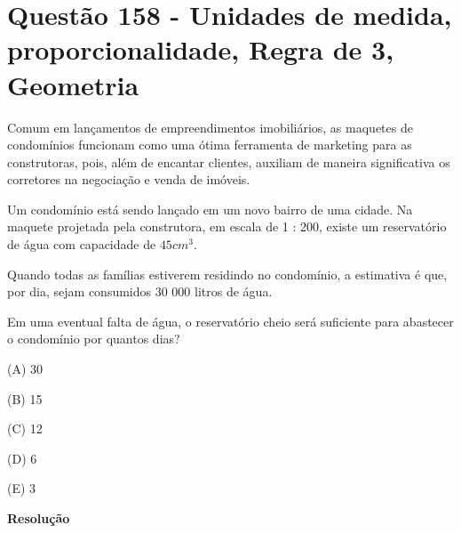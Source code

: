 \section{Questão 158 - Unidades de medida, proporcionalidade, Regra de 3, Geometria}

Comum em lançamentos de empreendimentos imobiliários, as maquetes de condomínios funcionam como uma ótima ferramenta de marketing para as construtoras, pois, além de encantar clientes, auxiliam de maneira significativa os corretores na negociação e venda de imóveis.

Um condomínio está sendo lançado em um novo bairro de uma cidade. Na maquete projetada pela construtora, em escala de 1 : 200, existe um reservatório de água com capacidade de $ 45 cm^3 $.

Quando todas as famílias estiverem residindo no condomínio, a estimativa é que, por dia, sejam consumidos 30 000 litros de água. 

Em uma eventual falta de água, o reservatório cheio será suficiente para abastecer o condomínio por quantos dias?

(A)  30

(B)  15

(C)  12

(D)  6

(E)  3


\textbf{Resolução}

\noindent {}

